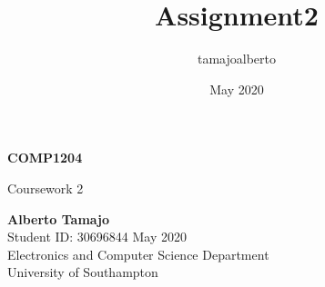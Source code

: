 \documentclass{article}
\title{Assignment2}
\author{tamajoalberto }
\date{May 2020}
\begin{document}
\begin{titlepage}
        \begin{center}
        
            \vfill
            \Huge
            \textbf{COMP1204\\}
            
            
            Coursework 2\\
        
            \vfill
            
            \textbf{Alberto Tamajo\\}
            \vspace{1cm}
            \Large
            Student ID: 30696844
            \vfill
            May 2020\\
            Electronics and Computer Science Department\\
            University of Southampton\\
        \end{center}
    \end{titlepage}
\end{document}
